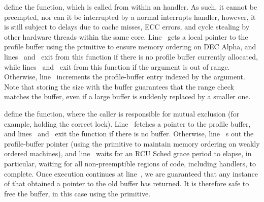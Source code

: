 \begin{fcvref}
 define the  function,
which is called from within an  handler.
As such, it cannot be preempted, nor can it be interrupted by a normal
interrupts handler, however, it is still subject to delays due to cache misses,
ECC errors, and cycle stealing by other hardware threads within the same
core.
Line~ gets a local pointer to the profile buffer using the
 primitive to ensure memory ordering on
DEC Alpha, and
lines~ and~ exit from this function if there is no
profile buffer currently allocated, while lines~ and~
exit from this function if the  argument
is out of range.
Otherwise, line~ increments the profile-buffer entry indexed
by the  argument.
Note that storing the size with the buffer guarantees that the
range check matches the buffer, even if a large buffer is suddenly
replaced by a smaller one.
\end{fcvref}

\begin{fcvref}
 define the  function,
where the caller is responsible for mutual exclusion (for example,
holding the correct lock).
Line~ fetches a pointer to the profile buffer, and
lines~ and~ exit the function if there is no buffer.
Otherwise, line~ s out the profile-buffer pointer
(using the  primitive to maintain
memory ordering on weakly ordered machines),
and line~ waits for an RCU Sched grace period to elapse,
in particular, waiting for all non-preemptible regions of code,
including  handlers, to complete.
Once execution continues at line~, we are guaranteed that
any instance of  that obtained a
pointer to the old buffer has returned.
It is therefore safe to free the buffer, in this case using the
 primitive.
\end{fcvref}


